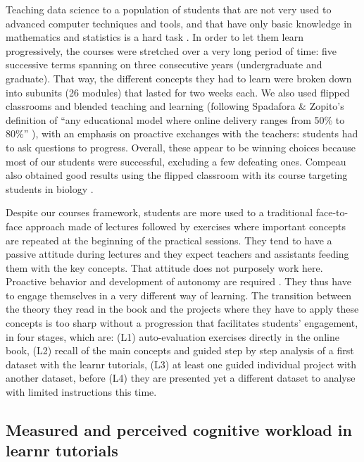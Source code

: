 \documentclass{aims}
\theoremstyle{definition}
\begin{document}
Teaching data science to a population of students that are not very used
to advanced computer techniques and tools, and that have only basic
knowledge in mathematics and statistics is a hard task \cite{Sousa2018}.
In order to let them learn progressively, the courses were stretched
over a very long period of time: five successive terms spanning on three
consecutive years (undergraduate and graduate). That way, the different
concepts they had to learn were broken down into subunits (26 modules)
that lasted for two weeks each. We also used flipped classrooms and
blended teaching and learning (following Spadafora \& Zopito's
definition of ``any educational model where online delivery ranges from
50\% to 80\%'' \cite{Spadafora2018}), with an emphasis on proactive
exchanges with the teachers: students had to ask questions to progress.
Overall, these appear to be winning choices because most of our students
were successful, excluding a few defeating ones. Compeau also obtained
good results using the flipped classroom with its course targeting
students in biology \cite{Compeau2019}.

Despite our courses framework, students are more used to a traditional
face-to-face approach made of lectures followed by exercises where
important concepts are repeated at the beginning of the practical
sessions. They tend to have a passive attitude during lectures and they
expect teachers and assistants feeding them with the key concepts. That
attitude does not purposely work here. Proactive behavior and
development of autonomy are required \cite{Freeman2014}. They thus have
to engage themselves in a very different way of learning. The transition
between the theory they read in the book and the projects where they
have to apply these concepts is too sharp without a progression that
facilitates students' engagement, in four stages, which are: (L1)
auto-evaluation exercises directly in the online book, (L2) recall of
the main concepts and guided step by step analysis of a first dataset
with the learnr tutorials, (L3) at least one guided individual project
with another dataset, before (L4) they are presented yet a different
dataset to analyse with limited instructions this time.

\hypertarget{measured-and-perceived-cognitive-workload-in-learnr-tutorials-2}{%
\subsection{Measured and perceived cognitive workload in learnr
tutorials}\label{measured-and-perceived-cognitive-workload-in-learnr-tutorials-2}}
\end{document}
